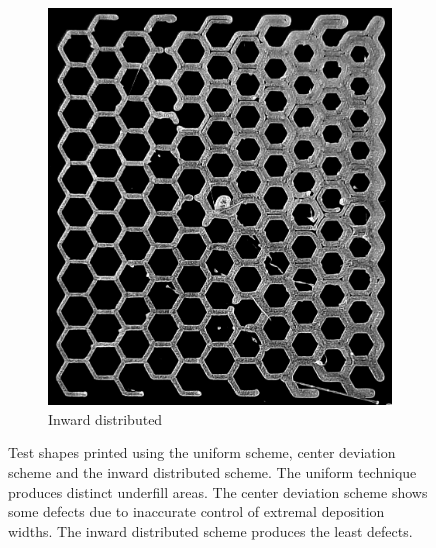 \begin{figure}
\begin{subfigure}{\figwidth}
\includegraphics[height=\figheight]{sources/applications/P3_print_hex_inward_edited.png}
\caption{Inward distributed}\label{print_inward}
\end{subfigure}
\caption{
Test shapes printed using the uniform scheme, center deviation scheme and the inward distributed scheme.
The uniform technique produces distinct underfill areas.
The center deviation scheme shows some defects due to inaccurate control of extremal deposition widths.
The inward distributed scheme produces the least defects.
}
\label{prints}
\end{figure}

